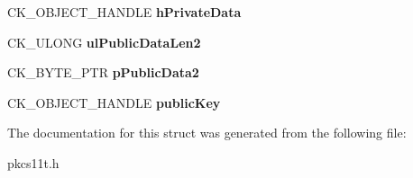 \begin{DoxyCompactItemize}
\item 
\mbox{\label{struct_c_k___e_c_m_q_v___d_e_r_i_v_e___p_a_r_a_m_s_a9ba1429299801b8e12bf02367d8c0c55}} 
C\+K\+\_\+\+O\+B\+J\+E\+C\+T\+\_\+\+H\+A\+N\+D\+LE {\bfseries h\+Private\+Data}
\item 
\mbox{\label{struct_c_k___e_c_m_q_v___d_e_r_i_v_e___p_a_r_a_m_s_a433e51c98a2ad536c8a69706c04c6193}} 
C\+K\+\_\+\+U\+L\+O\+NG {\bfseries ul\+Public\+Data\+Len2}
\item 
\mbox{\label{struct_c_k___e_c_m_q_v___d_e_r_i_v_e___p_a_r_a_m_s_a0bd74ccfdd71d504ec8a24dc058c7b9d}} 
C\+K\+\_\+\+B\+Y\+T\+E\+\_\+\+P\+TR {\bfseries p\+Public\+Data2}
\item 
\mbox{\label{struct_c_k___e_c_m_q_v___d_e_r_i_v_e___p_a_r_a_m_s_a81e24515ecc90a3deb1995b7e8303d9c}} 
C\+K\+\_\+\+O\+B\+J\+E\+C\+T\+\_\+\+H\+A\+N\+D\+LE {\bfseries public\+Key}
\end{DoxyCompactItemize}


The documentation for this struct was generated from the following file\+:\begin{DoxyCompactItemize}
\item 
pkcs11t.\+h\end{DoxyCompactItemize}
